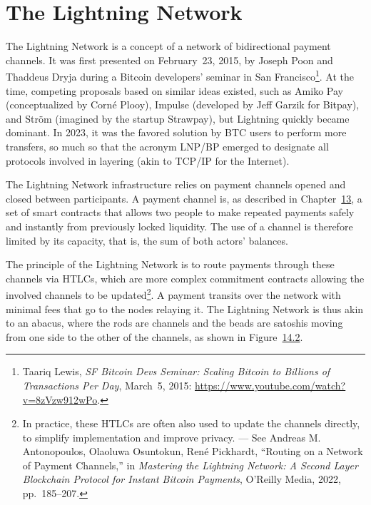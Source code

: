 \documentclass[
  a5paper,
  smalldemyvopaper,10pt,twoside,onecolumn,openright,extrafontsizes,hidelinks]{memoir}
\begin{document}
\section*{The Lightning Network}\label{the-lightning-network}


The Lightning Network is a concept of a network of bidirectional payment
channels. It was first presented on February~23, 2015, by Joseph Poon
and Thaddeus Dryja during a Bitcoin developers' seminar in San
Francisco\footnote{Taariq Lewis, \emph{SF Bitcoin Devs Seminar: Scaling
  Bitcoin to Billions of Transactions Per Day}, March~5, 2015:
  \url{https://www.youtube.com/watch?v=8zVzw912wPo}.}. At the time,
competing proposals based on similar ideas existed, such as Amiko Pay
(conceptualized by Corné Plooy), Impulse (developed by Jeff Garzik for
Bitpay), and Ström (imagined by the startup Strawpay), but Lightning
quickly became dominant. In 2023, it was the favored solution by BTC
users to perform more transfers, so much so that the acronym LNP/BP
emerged to designate all protocols involved in layering (akin to TCP/IP
for the Internet).

The Lightning Network infrastructure relies on payment channels opened
and closed between participants. A payment channel is, as described in
Chapter~\hyperref[ch:contrats]{13}, a set of smart contracts that allows
two people to make repeated payments safely and instantly from
previously locked liquidity. The use of a channel is therefore limited
by its capacity, that is, the sum of both actors' balances.

The principle of the Lightning Network is to route payments through
these channels via HTLCs, which are more complex commitment contracts
allowing the involved channels to be updated\footnote{In practice, these
  HTLCs are often also used to update the channels directly, to simplify
  implementation and improve privacy. --- See Andreas M. Antonopoulos,
  Olaoluwa Osuntokun, René Pickhardt, ``Routing on a Network of Payment
  Channels,'' in \emph{Mastering the Lightning Network: A Second Layer
  Blockchain Protocol for Instant Bitcoin Payments}, O'Reilly Media,
  2022, pp.~185--207.}. A payment transits over the network with minimal
fees that go to the nodes relaying it. The Lightning Network is thus
akin to an abacus, where the rods are channels and the beads are
satoshis moving from one side to the other of the channels, as shown in
Figure~\hyperref[fig:lightning-network-abacus]{14.2}.
\end{document}
